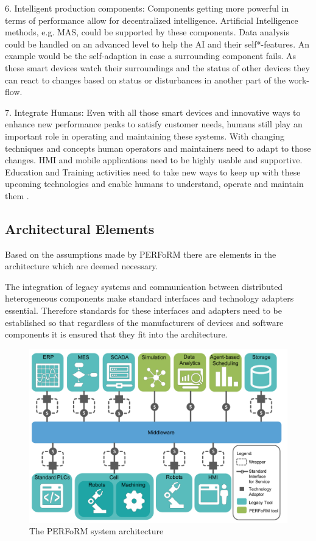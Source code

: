 \documentclass[conference,compsoc,hidelinks]{IEEEtran}
\begin{document}
6. Intelligent production components: Components getting more powerful in terms of performance allow for decentralized intelligence. Artificial Intelligence methods, e.g. MAS, could be supported by these components. Data analysis could be handled on an advanced level to help the AI and their self*-features. An example would be the self-adaption in case a surrounding component fails. As these smart devices watch their surroundings and the status of other devices they can react to changes based on status or disturbances in another part of the work-flow.

7. Integrate Humans: Even with all those smart devices and innovative ways to enhance new performance peaks to satisfy customer needs, humans still play an important role in operating and maintaining these systems. With changing techniques and concepts human operators and maintainers need to adapt to those changes. HMI and mobile applications need to be highly usable and supportive. Education and Training activities need to take new ways to keep up with these upcoming technologies and enable humans to understand, operate and maintain them \cite{SpecPERFoRM}.

\subsection{Architectural Elements}
Based on the assumptions made by PERFoRM there are elements in the architecture which are deemed necessary.

The integration of legacy systems and communication between distributed heterogeneous components make standard interfaces and technology adapters essential.
Therefore standards for these interfaces and adapters need to be established so that regardless of the manufacturers of devices and software components it is ensured that they fit into the architecture.

\begin{figure}[ht]
	\includegraphics[width=\columnwidth]{img/PERFoRM-Architecture.png}
	\caption{The PERFoRM system architecture\cite{SpecPERFoRM}}
	\label{fig:PERFoRM-Architecture}
\end{figure}
\end{document}
